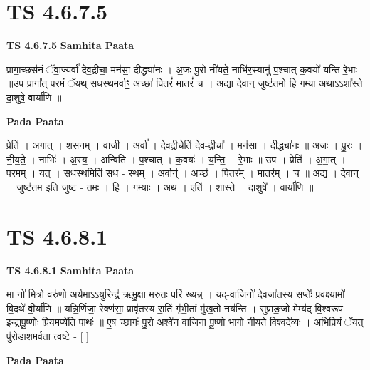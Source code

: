 \documentclass[17pt]{extarticle}
\begin{document}

\section{ TS 4.6.7.5 }

\textbf{TS 4.6.7.5 } \newline
\textbf{Samhita Paata} \newline

प्रागा॒च्छस॑नं ॅवा॒ज्यर्वा॑ देव॒द्रीचा॒ मन॑सा॒ दीद्ध्या॑नः । अ॒जः पु॒रो नी॑यते॒ नाभि॑र॒स्यानु॑ प॒श्चात् क॒वयो॑ यन्ति रे॒भाः ॥उप॒ प्रागा᳚त् पर॒मं ॅयथ् स॒धस्थ॒मर्वाꣳ॒॒ अच्छा॑ पि॒तरं॑ मा॒तरं॑ च । अ॒द्या दे॒वान् जुष्ट॑तमो॒ हि ग॒म्या अथाऽऽशा᳚स्ते दा॒शुषे॒ वार्या॑णि ॥ \newline

\textbf{Pada Paata} \newline

प्रेति॑ । अ॒गा॒त् । शस॑नम् । वा॒जी । अर्वा᳚ । दे॒व॒द्रीचेति॑ देव-द्रीचा᳚ । मन॑सा । दीद्ध्या॑नः ॥ अ॒जः । पु॒रः । नी॒य॒ते॒ । नाभिः॑ । अ॒स्य॒ । अन्विति॑ । प॒श्चात् । क॒वयः॑ । य॒न्ति॒ । रे॒भाः ॥ उप॑ । प्रेति॑ । अ॒गा॒त् । प॒र॒मम् । यत् । स॒धस्थ॒मिति॑ स॒ध - स्थ॒म् । अर्वान्॑ । अच्छ॑ । पि॒तर᳚म् । मा॒तर᳚म् । च॒ ॥ अ॒द्य । दे॒वान् । जुष्ट॑तम॒ इति॒ जुष्ट॑ - त॒मः॒ । हि । ग॒म्याः । अथ॑ । एति॑ । शा॒स्ते॒ । दा॒शुषे᳚ । वार्या॑णि ॥  \newline





\section{ TS 4.6.8.1 }

\textbf{TS 4.6.8.1 } \newline
\textbf{Samhita Paata} \newline

मा नो॑ मि॒त्रो वरु॑णो अर्य॒माऽऽयुरिन्द्र॑ ऋभु॒क्षा म॒रुतः॒ परि॑ ख्यन्न् । यद्-वा॒जिनो॑ दे॒वजा॑तस्य॒ सप्तेः᳚ प्रव॒क्ष्यामो॑ वि॒दथे॑ वी॒र्या॑णि ॥ यन्नि॒र्णिजा॒ रेक्ण॑सा॒ प्रावृ॑तस्य रा॒तिं गृ॑भी॒तां मु॑ख॒तो नय॑न्ति । सुप्रा॑ङ॒जो मेम्य॑द् वि॒श्वरू॑प इन्द्रापू॒ष्णोः प्रि॒यमप्ये॑ति॒ पाथः॑ ॥ ए॒ष च्छागः॑ पु॒रो अश्वे॑न वा॒जिना॑ पू॒ष्णो भा॒गो नी॑यते वि॒श्वदे᳚व्यः । अ॒भि॒प्रियं॒ ॅयत् पु॑रो॒डाश॒मर्व॑ता॒ त्वष्टे - [  ] \newline

\textbf{Pada Paata} \newline
\end{document}
